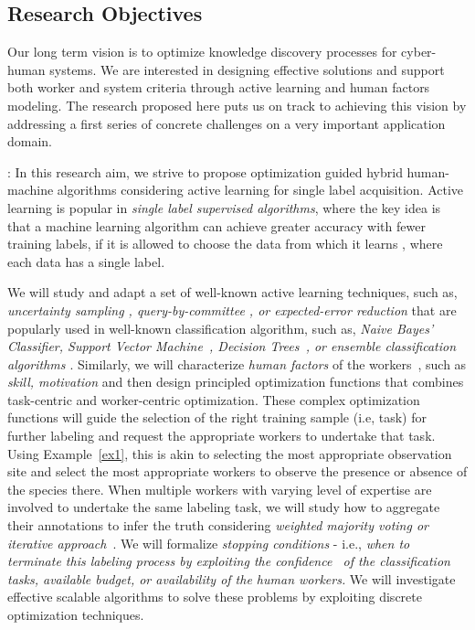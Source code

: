 \subsection{Research Objectives} 
\vspace{-0.1in}
Our long term vision is to optimize knowledge discovery processes for cyber-human systems. We are interested in designing effective solutions and support both worker and system criteria  through active learning and human factors modeling. The research proposed here puts us on track to achieving this vision by addressing a first series of concrete challenges on a very important application domain.


\smallbreak {}: In this research aim, we strive to propose optimization guided hybrid human-machine algorithms considering active learning for single label acquisition. Active learning is popular in {\em single label supervised algorithms}, where the key idea is that a machine learning algorithm can achieve greater accuracy with fewer training labels, if it is allowed to choose the data from which it learns \cite{al1,al2,al-survey,qbc1}, where each data has a single label. 

We will study and adapt a set of well-known active learning techniques, such as, {\em uncertainty sampling \cite{al1}, query-by-committee \cite{qbc1,qbc2}, or expected-error reduction\cite{error-reduction}} that are popularly used in well-known classification algorithm, such as, {\em Naive Bayes' Classifier, Support Vector Machine~\cite{al-svm,al-svm2}, Decision Trees~\cite{al-dtree}, or ensemble classification algorithms \cite{korner2006multi}}. Similarly, we will characterize  {\em human factors} of the workers~\cite{hf1,motiv1,motiv2}, such as {\em skill, motivation} and then design principled optimization functions that combines task-centric and worker-centric optimization.  These complex optimization functions will guide the selection of the right training sample (i.e, task) for further labeling and request the appropriate workers to undertake that task. Using Example~\ref{ex1}, this is akin to selecting the most appropriate observation site and select the most appropriate workers to observe the presence or absence of the species there. When multiple workers with varying level of expertise are involved to undertake the same labeling task, we will study how to aggregate their annotations to infer the truth considering {\em weighted majority voting or iterative approach}~\cite{ho2013adaptive,hung2013evaluation}. We will formalize {\em stopping conditions} - i.e., {\em when to terminate this labeling process by exploiting the confidence~\cite{vlachos2008stopping} of the classification tasks, available budget, or availability of the human workers.}  We will investigate effective scalable algorithms  to solve these problems by exploiting discrete optimization techniques.


